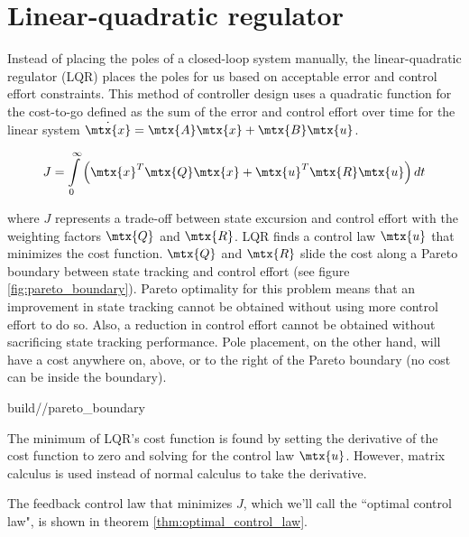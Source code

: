 \section{Linear-quadratic regulator} \label{sec:lqr}

Instead of placing the poles of a closed-loop \gls{system} manually, the
linear-quadratic regulator (LQR) places the poles for us based on acceptable
\gls{error} and \gls{control effort} constraints. This method of controller
design uses a quadratic function for the cost-to-go defined as the sum of the
\gls{error} and \gls{control effort} over time for the linear \gls{system}
$\dot{\mtx{x}} = \mtx{A}\mtx{x} + \mtx{B}\mtx{u}$.

\begin{equation*}
  J = \int\limits_0^\infty \left(\mtx{x}^T\mtx{Q}\mtx{x} +
    \mtx{u}^T\mtx{R}\mtx{u}\right) dt
\end{equation*}

where $J$ represents a trade-off between \gls{state} excursion and
\gls{control effort} with the weighting factors $\mtx{Q}$ and $\mtx{R}$. LQR
finds a \gls{control law} $\mtx{u}$ that minimizes the cost function. $\mtx{Q}$
and $\mtx{R}$ slide the cost along a Pareto boundary between state tracking and
\gls{control effort} (see figure \ref{fig:pareto_boundary}). Pareto optimality
for this problem means that an improvement in state \gls{tracking} cannot be
obtained without using more \gls{control effort} to do so. Also, a reduction in
\gls{control effort} cannot be obtained without sacrificing state \gls{tracking}
performance. Pole placement, on the other hand, will have a cost anywhere on,
above, or to the right of the Pareto boundary (no cost can be inside the
boundary).

\begin{svg}{build/\chapterpath/pareto_boundary}
  \caption{Pareto boundary for LQR}
  \label{fig:pareto_boundary}
\end{svg}

The minimum of LQR's cost function is found by setting the derivative of the
cost function to zero and solving for the \gls{control law} $\mtx{u}$. However,
matrix calculus is used instead of normal calculus to take the derivative.

The feedback \gls{control law} that minimizes $J$, which we'll call the
``optimal control law", is shown in theorem \ref{thm:optimal_control_law}.

